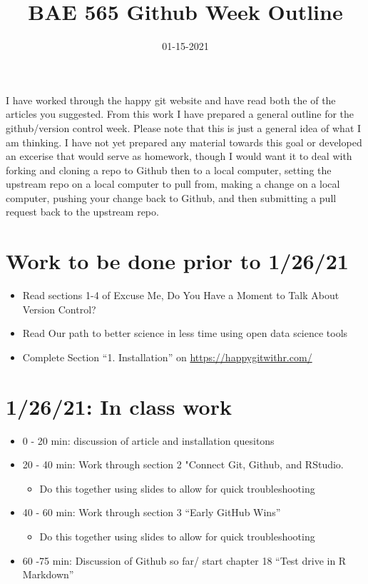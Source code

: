 \documentclass[
]{article}
\title{BAE 565 Github Week Outline}
\author{}
\date{\vspace{-2.5em}01-15-2021}
\providecommand{\tightlist}{%
  \setlength{\itemsep}{0pt}\setlength{\parskip}{0pt}}
\begin{document}
\maketitle

I have worked through the happy git website and have read both the of
the articles you suggested. From this work I have prepared a general
outline for the github/version control week. Please note that this is
just a general idea of what I am thinking. I have not yet prepared any
material towards this goal or developed an excerise that would serve as
homework, though I would want it to deal with forking and cloning a repo
to Github then to a local computer, setting the upstream repo on a local
computer to pull from, making a change on a local computer, pushing your
change back to Github, and then submitting a pull request back to the
upstream repo.

\hypertarget{work-to-be-done-prior-to-12621}{%
\section{Work to be done prior to
1/26/21}\label{work-to-be-done-prior-to-12621}}

\begin{itemize}
\tightlist
\item
  Read sections 1-4 of Excuse Me, Do You Have a Moment to Talk About
  Version Control?
\item
  Read Our path to better science in less time using open data science
  tools
\item
  Complete Section ``1. Installation'' on
  \url{https://happygitwithr.com/}
\end{itemize}

\hypertarget{in-class-work}{%
\section{1/26/21: In class work}\label{in-class-work}}

\begin{itemize}
\tightlist
\item
  0 - 20 min: discussion of article and installation quesitons
\item
  20 - 40 min: Work through section 2 "Connect Git, Github, and RStudio.

  \begin{itemize}
  \tightlist
  \item
    Do this together using slides to allow for quick troubleshooting
  \end{itemize}
\item
  40 - 60 min: Work through section 3 ``Early GitHub Wins''

  \begin{itemize}
  \tightlist
  \item
    Do this together using slides to allow for quick troubleshooting
  \end{itemize}
\item
  60 -75 min: Discussion of Github so far/ start chapter 18 ``Test drive
  in R Markdown''
\end{itemize}
\end{document}
